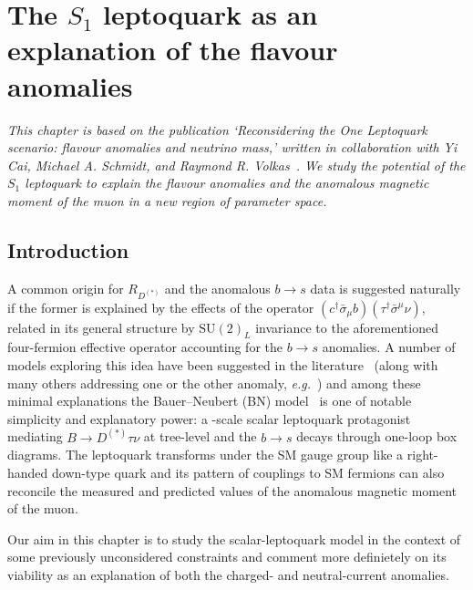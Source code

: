 \graphicspath{{img/chapter_3/}}


\chapter{The $S_{1}$ leptoquark as an explanation of the flavour anomalies}
\label{chapter:the-one-lq}

\begin{flushleft}
  \textit{This chapter is based on the publication `Reconsidering the One
    Leptoquark scenario: flavour anomalies and neutrino mass,' written in
    collaboration with Yi Cai, Michael A. Schmidt, and Raymond R.
    Volkas~\cite{Cai:2017wry}. We study the potential of the $S_{1}$ leptoquark
    to explain the flavour anomalies and the anomalous magnetic moment of the
    muon in a new region of parameter space.}
\end{flushleft}

\section{Introduction}

A common origin for $R_{D^{(*)}}$ and the anomalous $b\rightarrow s$ data is
suggested naturally if the former is explained by the effects of the operator
$(c^{\dagger} \bar{\sigma}_\mu b)(\tau^{\dagger} \bar{\sigma}^\mu \nu)$, related
in its general structure by $\mathrm{SU}(2)_L$ invariance to the aforementioned
four-fermion effective operator accounting for the $b \rightarrow s$ anomalies.
A number of models exploring this idea have been suggested in the
literature~\cite{Alonso:2015sja, Bauer:2015knc, Becirevic:2016oho,
  Becirevic:2016yqi, Boucenna:2016wpr, Boucenna:2016qad, Calibbi:2015kma,
  Crivellin:2017zlb, Deppisch:2016qqd, Deshpand:2016cpw, Fajfer:2015ycq,
  Feruglio:2016gvd, Feruglio:2017rjo, Megias:2017ove, Popov:2016fzr} (along with
many others addressing one or the other anomaly,
\textit{e.g.}~\cite{Becirevic:2015asa, Becirevic:2017jtw, Buras:2013qja,
  Freytsis:2015qca, Gauld:2013qba, Glashow:2014iga, Gripaios:2014tna,
  Hiller:2014ula, Hiller:2014yaa, Mahmoudi:2014mja, Megias:2016bde, Pas:2015hca,
  Sahoo:2015fla, Sahoo:2015qha, Sakaki:2013bfa, Sierra:2015fma,
  Varzielas:2015iva, deBoer:2015boa}) and among these minimal explanations the
Bauer--Neubert (BN) model~\cite{Bauer:2015knc} is one of notable simplicity and
explanatory power: a \TeV-scale scalar leptoquark protagonist mediating
$B \rightarrow D^{(*)} \tau \nu$ at tree-level and the $b \rightarrow s$ decays
through one-loop box diagrams. The leptoquark transforms under the SM gauge
group like a right-handed down-type quark and its pattern of couplings to SM
fermions can also reconcile the measured and predicted values of the anomalous
magnetic moment of the muon.

Our aim in this chapter is to study the scalar-leptoquark model in the context
of some previously unconsidered constraints and comment more definietely on its
viability as an explanation of both the charged- and neutral-current anomalies.
